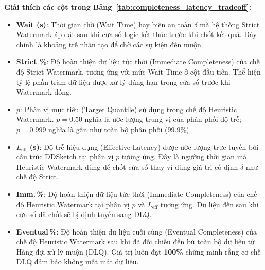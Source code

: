 \documentclass[12pt,a4paper]{article}
\begin{document}
\textbf{Giải thích các cột trong Bảng~\ref{tab:completeness_latency_tradeoff}:}
\begin{itemize}[leftmargin=*]
    \item \textbf{Wait (s)}: Thời gian chờ (Wait Time) hay biên an toàn $\delta$ mà hệ thống Strict Watermark áp đặt sau khi cửa sổ logic kết thúc trước khi chốt kết quả. Đây chính là khoảng trễ nhân tạo để chờ các sự kiện đến muộn.
    \item \textbf{Strict \%}: Độ hoàn thiện dữ liệu tức thời (Immediate Completeness) của chế độ Strict Watermark, tương ứng với mức Wait Time ở cột đầu tiên. Thể hiện tỷ lệ phần trăm dữ liệu được xử lý đúng hạn trong cửa sổ trước khi Watermark đóng.
    \item \textbf{$p$}: Phân vị mục tiêu (Target Quantile) sử dụng trong chế độ Heuristic Watermark. $p = 0.50$ nghĩa là ước lượng trung vị của phân phối độ trễ; $p = 0.999$ nghĩa là gần như toàn bộ phân phối (99.9\%).
    \item \textbf{$L_{\text{eff}}$ (s)}: Độ trễ hiệu dụng (Effective Latency) được ước lượng trực tuyến bởi cấu trúc DDSketch tại phân vị $p$ tương ứng. Đây là ngưỡng thời gian mà Heuristic Watermark dùng để chốt cửa sổ thay vì dùng giá trị cố định $\delta$ như chế độ Strict.
    \item \textbf{Imm.\,\%}: Độ hoàn thiện dữ liệu tức thời (Immediate Completeness) của chế độ Heuristic Watermark tại phân vị $p$ và $L_{\text{eff}}$ tương ứng. Dữ liệu đến sau khi cửa sổ đã chốt sẽ bị định tuyến sang DLQ.
    \item \textbf{Eventual\,\%}: Độ hoàn thiện dữ liệu cuối cùng (Eventual Completeness) của chế độ Heuristic Watermark sau khi đã đối chiếu đền bù toàn bộ dữ liệu từ Hàng đợi xử lý muộn (DLQ). Giá trị luôn đạt \textbf{100\%} chứng minh rằng cơ chế DLQ đảm bảo không mất mát dữ liệu.
\end{itemize}
\end{document}
